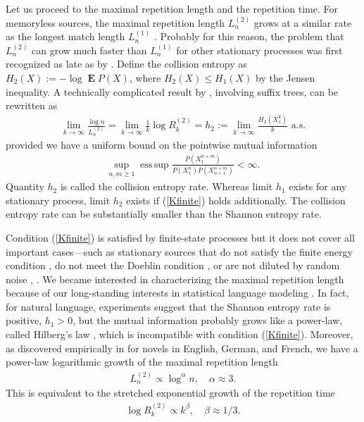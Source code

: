 \documentclass[a4paper,12pt]{article}
\DeclareMathOperator{\esssup}{ess\, sup}
\DeclareMathOperator{\mean}{\mathbf{E}}
\begin{document}
Let us proceed to the maximal repetition length and the repetition
time.  For memoryless sources, the maximal repetition length
$L^{(2)}_n$ grows at a similar rate as the longest match length
$L^{(1)}_n$ \citep{ErdosRenyi70,ArratiaWaterman89}. Probably for this
reason, the problem that $L^{(2)}_n$ can grow much faster than
$L^{(1)}_n$ for other stationary processes was first recognized as
late as by \citet{Shields92b,Shields97}. Define the collision entropy
as $H_2(X):=-\log\mean P(X)$, where $H_2(X)\le H_1(X)$ by the Jensen
inequality.  A technically complicated result by
\citet{Szpankowski93,Szpankowski93a}, involving suffix trees, can be
rewritten as
\begin{align}
  \label{Szpankowski}
  \lim_{k\to\infty} \frac{\log n}{L^{(2)}_n}
  =\lim_{k\to\infty} \frac{1}{k}\log R^{(2)}_k
  =h_2:=\lim_{k\to\infty} \frac{H_2(X_1^k)}{k}
  \text{ a.s.}
\end{align}
provided we have a uniform bound on the pointwise mutual information
\begin{align}
  \label{Kfinite}
  \sup_{n,m\ge 1}\esssup
     \frac{P(X_1^{n+m})}{P(X_1^n)P(X_{n+1}^{n+m})}
     < \infty.
\end{align}
Quantity $h_2$ is called the collision entropy rate. Whereas limit
$h_1$ exists for any stationary process, limit $h_2$ exists if
(\ref{Kfinite}) holds additionally. The collision entropy rate can be
substantially smaller than the Shannon entropy rate.

Condition (\ref{Kfinite}) is satisfied by finite-state processes
\citep[Theorem 11.3]{Debowski21} but it does not cover all important
cases---such as stationary sources that do not satisfy the finite
energy condition \citep{Shields92b,Shields97}, do not meet the Doeblin
condition \citep[Theorem 11.7]{Debowski21}, or are not diluted by
random noise \citep{Shields97}, \citep[Theorem 11.6]{Debowski21}.  We
became interested in characterizing the maximal repetition length
because of our long-standing interests in statistical language
modeling \citep{Debowski21}.  In fact, for natural language,
experiments suggest that the Shannon entropy rate is positive,
$h_1>0$, \citep{Shannon51,CoverKing78,BehrOthers03} but the mutual
information probably grows like a power-law, called Hilberg's law
\citep{Hilberg90, TakahiraOthers16, KaplanOther20, Debowski21}, which
is incompatible with condition (\ref{Kfinite}). Moreover, as
discovered empirically in \citep{Debowski12b,Debowski15f} for novels
in English, German, and French, we have a power-law logarithmic growth
of the maximal repetition length
\begin{align}
  L^{(2)}_n\propto \log^\alpha n,\quad \alpha\approx 3.
\end{align}
This is equivalent to the stretched exponential growth of the
repetition time
\begin{align}
  \log R^{(2)}_k\propto k^\beta,\quad \beta\approx 1/3.
\end{align}
\end{document}

